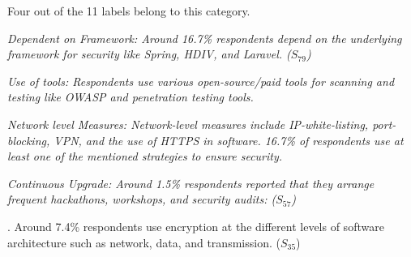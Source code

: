 \begin{inparaenum}[(1)]
\item {} Four out of the 11 labels belong to this category. 
\begin{inparaenum}
  \item \it{Dependent on Framework}: Around 16.7\% 
  respondents depend on the underlying framework for security like Spring, HDIV, and Laravel. 
  ($S_{79}$)
  \item \it{Use of tools}: Respondents use various open-source/paid tools for
  scanning and testing like OWASP and penetration testing tools.
  \item \it{Network level Measures}: Network-level measures include
  IP-white-listing, port-blocking, VPN, and the use of HTTPS in software.
  16.7\% of respondents use at least one of the mentioned strategies to ensure
  security.
  \item \it{Continuous Upgrade}: Around 1.5\% 
  respondents reported that they arrange frequent hackathons, workshops, and
  security audits: ($S_{57}$)
\end{inparaenum}

\item {}. Around 7.4\% respondents use encryption at
the different levels of software architecture such as network, data, and
transmission.
($S_{35}$)
\end{inparaenum}
% 
% 
